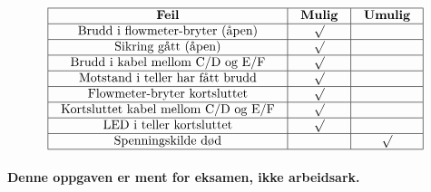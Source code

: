 $$\vbox{\offinterlineskip
\halign{\strut
\vrule \quad\hfil # \ \hfil &
\vrule \quad\hfil # \ \hfil &
\vrule \quad\hfil # \ \hfil \vrule \cr
\noalign{\hrule}
%
{\bf Feil} & {\bf Mulig} & {\bf Umulig} \cr
%
\noalign{\hrule}
%
Brudd i flowmeter-bryter (åpen) & $\surd$ &  \cr
%
\noalign{\hrule}
%
Sikring gått (åpen) & $\surd$ &  \cr
%
\noalign{\hrule}
%
Brudd i kabel mellom C/D og E/F & $\surd$ &  \cr
%
\noalign{\hrule}
%
Motstand i teller har fått brudd & $\surd$ &  \cr
%
\noalign{\hrule}
%
Flowmeter-bryter kortsluttet & $\surd$ &  \cr
%
\noalign{\hrule}
%
Kortsluttet kabel mellom C/D og E/F & $\surd$ &  \cr
%
\noalign{\hrule}
%
LED i teller kortsluttet & $\surd$ &  \cr
%
\noalign{\hrule}
%
Spenningskilde død &  & $\surd$ \cr
%
\noalign{\hrule}
} %
}$$ %








{\bf Denne oppgaven er ment for eksamen, ikke arbeidsark.}


